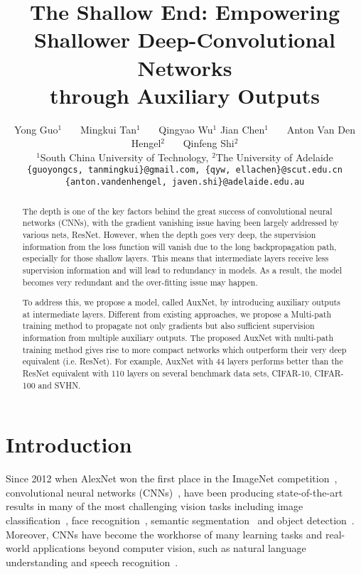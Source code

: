 \documentclass[10pt,onecolumn,letterpaper]{article}
\author{Yong Guo$^1$~~~ Mingkui Tan$^1$~~~ Qingyao Wu$^1$ Jian Chen$^1$~~~ Anton Van Den Hengel$^2$~~~ Qinfeng Shi$^2$\\
$^1$South China University of Technology, $^2$The University of Adelaide\\
{\tt\small \{guoyongcs, tanmingkui\}@gmail.com, \{qyw, ellachen\}@scut.edu.cn} \\
{\tt\small \{anton.vandenhengel, javen.shi\}@adelaide.edu.au}
}
\def\SexyName{AuxNet\xspace}
\begin{document}
\title{The Shallow End: Empowering Shallower Deep-Convolutional Networks\\ through Auxiliary Outputs}


\maketitle

\begin{abstract}
The depth is one of the key factors behind the great success of convolutional neural networks (CNNs), with the gradient vanishing issue having been largely addressed by various nets, \eg ResNet. However, when the depth goes very deep, the supervision information from the loss function will vanish due to the long backpropagation path,  especially for those shallow layers. This means that intermediate layers receive less supervision information and will lead to redundancy in models. As a result, the model becomes very redundant and the over-fitting issue may happen.



To address this, we propose a model, called \SexyName, by introducing auxiliary outputs at intermediate layers. Different from existing approaches, we propose a Multi-path training method to propagate not only gradients but also sufficient supervision information from multiple auxiliary outputs. The proposed AuxNet with multi-path training method  gives rise to more compact networks which outperform their very deep equivalent (i.e. ResNet). For example, AuxNet with 44 layers performs better than the ResNet equivalent with 110 layers on several benchmark data sets, \ie CIFAR-10, CIFAR-100 and SVHN.





\end{abstract}

\section{Introduction} \label{sec:introduction}
Since 2012 when AlexNet won the first place in the ImageNet competition~\cite{krizhevsky2012imagenet}, convolutional neural networks (CNNs)~\cite{lecun1989backpropagation}, have been producing state-of-the-art results in many of the most challenging vision tasks including image classification~\cite{krizhevsky2012imagenet,Lee2015,he2015deep}, face recognition~\cite{schroff2015facenet,sun2015deeply}, semantic segmentation~\cite{long2015fully} and object detection~\cite{ren2015faster,Zagoruyko2016}.
Moreover, CNNs  have become the  workhorse of many learning tasks and real-world applications beyond computer vision, such as natural language understanding and speech recognition~\cite{lecun2015deep}.
\end{document}
